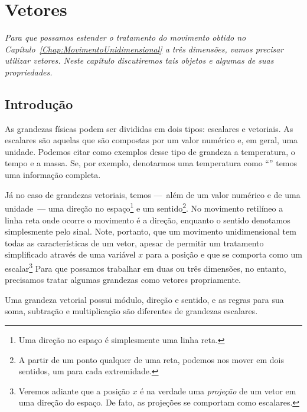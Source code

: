 \chapter{Vetores}
\label{Chap:Vetores}


\begin{fullwidth}
{\it
Para que possamos estender o tratamento do movimento obtido no Capítulo~\ref{Chap:MovimentoUnidimensional} a três dimensões, vamos precisar utilizar vetores. Neste capítulo discutiremos tais objetos e algumas de suas propriedades.
}
\end{fullwidth}

\section{Introdução}

As grandezas físicas podem ser divididas em dois tipos: escalares e vetoriais. As escalares são aquelas que são compostas por um valor numérico e, em geral, uma unidade. Podemos citar como exemplos desse tipo de grandeza a temperatura, o tempo e a massa. Se, por exemplo, denotarmos uma temperatura como ``'' temos uma informação completa.

Já no caso de grandezas vetoriais, temos ---~além de um valor numérico e de uma unidade~--- uma direção no espaço\footnote{Uma direção no espaço é simplesmente uma linha reta.} e um sentido\footnote{A partir de um ponto qualquer de uma reta, podemos nos mover em dois sentidos, um para cada extremidade.}. No movimento retilíneo a linha reta onde ocorre o movimento é a direção, enquanto o sentido denotamos simplesmente pelo sinal. Note, portanto, que um movimento unidimensional tem todas as características de um vetor, apesar de permitir um tratamento simplificado através de uma variável $x$ para a posição e que se comporta como um escalar\footnote{Veremos adiante que a posição $x$ é na verdade uma \emph{projeção} de um vetor em uma direção do espaço. De fato, as projeções se comportam como escalares.} Para que possamos trabalhar em duas ou três dimensões, no entanto, precisamos tratar algumas grandezas como vetores propriamente.

 Uma grandeza vetorial possui módulo, direção e sentido, e as regras para sua soma, subtração e multiplicação são diferentes de grandezas escalares. 

